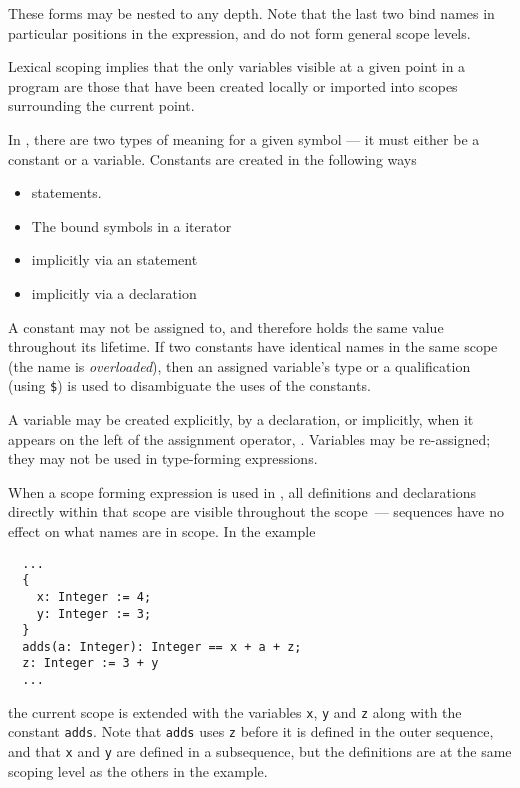 These forms may be nested to any depth. Note that the last two bind
names in particular positions in the expression, and do not form
general scope levels.

Lexical scoping implies that the only variables
visible at a given point in a program are those that have been
created locally or imported into scopes surrounding the current
point.

In \asharp{}, there are two types of meaning for a given symbol ---
it must either be a constant or a variable. Constants are created in
the following ways
\begin{itemize}
\item \ttin{==} statements.
\keywordIndex{==}
\item The bound symbols in a  iterator
\item implicitly via an  statement
\item implicitly via a declaration
\end{itemize}

A constant may not be assigned to, and therefore holds the same
value throughout its lifetime. If two constants have identical names
in the same scope (the name is {\em overloaded}), then an assigned
variable's type or a qualification (using \verb"$") is used to disambiguate
the uses of the constants.

A variable may be created explicitly, by a declaration, or implicitly,
when it appears on the left of the assignment operator, \ttin{:=}%
\keywordIndex{:=}.
Variables may be re-assigned; they may not be used in type-forming
expressions.

When a scope forming expression is used in \asharp{}, all definitions
and declarations directly within that scope are visible throughout the
scope~--- sequences have no effect on what names are in scope.
In the example

\begin{small}
\begin{verbatim}
  ...
  {
    x: Integer := 4;
    y: Integer := 3;
  }
  adds(a: Integer): Integer == x + a + z;
  z: Integer := 3 + y
  ...
\end{verbatim}
\end{small}

the current scope is extended with the variables
{\tt x},
{\tt y} and
{\tt z} along with the constant {\tt adds}. Note that {\tt adds} uses
{\tt z} before it is defined in the outer sequence, and that {\tt x}
and {\tt y} are defined in a subsequence, but the definitions are at
the same scoping level as the others in the example.

